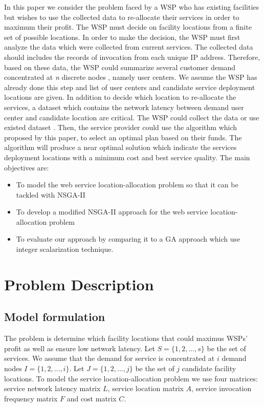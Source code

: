\documentclass[twoside]{article}
\begin{document}
In this paper we consider the problem faced by a WSP who has existing facilities but wishes to use the collected data to re-allocate their services in order to maximum their profit.
The WSP must decide on facility locations from a finite set of possible locations. 
In order to make the decision, the WSP must first analyze the data which were collected from current services. 
The collected data should includes the records of invocation from each unique IP address.
Therefore, based on these data, the WSP could summarize several customer demand concentrated at \textit{n} discrete nodes \cite{Aboolian200964}, namely user centers. 
We assume the WSP has already done this step and list of user centers and candidate service deployment locations are given.
In addition to decide which location to re-allocate the services, a dataset which contains the network latency between demand user center and candidate location are critical. 
The WSP could collect the data or use existed dataset \cite{5552800, 6076756}. 
Then, the service provider could use the algorithm which proposed by this paper, to select an optimal plan based on their funds. 
The algorithm will produce a near optimal solution which indicate the services deployment locations with a minimum cost and best service quality.
The main objectives are:
\begin{itemize}
	\item To model the web service location-allocation problem so that it can be tackled with NSGA-II
	\item To develop a modified NSGA-II approach for the web service location-allocation problem
	\item To evaluate our approach by comparing it to a GA approach which use integer scalarization technique.
\end{itemize}











\section{Problem Description}
\subsection{Model formulation}
The problem is determine which facility locations that could maximus WSPs’ profit as well as ensure low network latency. 
Let $S = \{ 1, 2, ..., s\}$ be the set of services. We assume that the demand for service is concentrated at $i$ 
demand nodes $I = \{ 1, 2, ..., i \}$. Let $J = \{ 1, 2, ..., j \}$ be the set of $j$ candidate facility locations.
To model the service location-allocation problem we use four matrices: service network latency matrix $L$, service location
matrix $A$, service invocation frequency matrix $F$ and cost matrix $C$.
\end{document}
